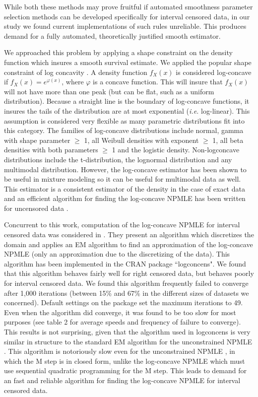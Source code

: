 	 While both these methods may prove fruitful if automated smoothness parameter selection methods can be developed specifically for interval censored data, in our study we found current implementations of such rules unreliable. This produces demand for a fully automated, theoretically justified smooth estimator. 
		
	We approached this problem by applying a shape constraint on the density function which insures a smooth survival estimate. We applied the popular shape constraint of log concavity \cite{RefBB2005}. A density function $f_X(x)$ is considered log-concave if $f_X(x) = e^{\varphi(x)}$, where $\varphi$ is a concave function. This will insure that $f_X(x)$ will not have more than one peak (but can be flat, such as a uniform distribution). Because a straight line is the boundary of log-concave functions, it insures the tails of the distribution are at most exponential (\emph{i.e.} log-linear). This assumption is considered very flexible as many parametric distributions fit into this category. The families of log-concave distributions include normal, gamma with shape parameter $\ge$ 1, all Weibull densities with exponent $\ge$ 1, all beta densities with both parameters $\ge$ 1 and the logistic density. Non-logconcave distributions include the t-distribution, the lognormal distribution and any multimodal distribution. However, the log-concave estimator has been shown to be useful in mixture modeling \cite{RefCW2007} so it can be useful for multimodal data as well. This estimator is a consistent estimator of the density in the case of exact data \cite{RefDR2009} and an efficient algorithm for finding the log-concave NPMLE has been written for uncensored data \cite{RefDea2011}. 

	Concurrent to this work, computation of the log-concave NPMLE for interval censored data was considered in \cite{RefDea2011}. They present an algorithm which discretizes the domain and  applies an EM algorithm to find an approximation of the log-concave NPMLE (only an approximation due to the discretizing of the data). This algorithm has been implemented in the CRAN package ``logconcens". We found that this algorithm behaves fairly well for right censored data, but behaves poorly for interval censored data. We found this algorithm frequently failed to converge after 1,000 iterations (between 15\% and 67\% in the different sizes of datasets we concerned). Default settings on the package set the maximum iterations to 49. Even when the algorithm did converge, it was found to be too slow for most purposes (see table 2 for average speeds and frequency of failure to converge). This results is not surprising, given that the algorithm used in logconcens is very similar in structure to the standard EM algorithm for the unconstrained NPMLE \cite{RefT1976}. This algorithm is notoriously slow even for the unconstrained NPMLE \cite{RefJ1998}, in which the M step is in closed form, unlike the log-concave NPMLE which must use sequential quadratic programming for the M step. This leads to demand for an fast and reliable algorithm for finding the log-concave NPMLE for interval censored data. 
		
